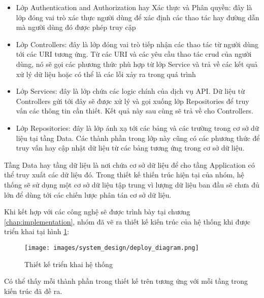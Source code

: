 \documentclass[../main.tex]{subfiles}
\begin{document}
	\begin{itemize}
		\item Lớp Authentication and Authorization hay Xác thực và Phân quyền: đây là lớp đóng vai trò xác thực người dùng
		để xác định các thao tác hay đường dẫn mà người dùng đó được phép truy cập
		\item Lớp Controllers: đây là lớp đóng vai trò tiếp nhận các thao tác từ người dùng tới các URI tương ứng. Từ các
		URI và các yêu cầu thao tác \Gls{crud} của người dùng, nó sẽ gọi các phương thức phù hợp từ lớp Service và trả về
		các kết quả xử lý dữ liệu hoặc có thể là các lỗi xảy ra trong quá trình
		\item Lớp Services: đây là lớp chứa các logic chính của dịch vụ API. Dữ liệu từ Controllers gửi tới đây sẽ được xử
		lý và gọi xuống lớp Repositories để truy vấn các thông tin cần thiết. Kết quả này sau cùng sẽ trả về cho
		Controllers.
		\item Lớp Repositories: đây là lớp ánh xạ tới các bảng và các trường trong cơ sở dữ liệu tại tầng Data. Các thành
		phần trong lớp này cũng có các phương thức để truy vấn hay cập nhật dữ liệu từ các bảng tương ứng trong cơ sở dữ
		liệu.
	\end{itemize}

	Tầng Data hay tầng dữ liệu là nơi chứa cơ sở dữ liệu để cho tầng Application có thể truy xuất các dữ liệu đó. Trong 
	thiết kế thiến trúc hiện tại của nhóm, hệ thống sẽ sử dụng một cơ sở dữ liệu tập trung vì lượng dữ liệu ban đầu sẽ 
	chưa đủ lớn để dùng tới các chiến lược phân tán cơ sở dữ liệu.

	Khi kết hợp với các công nghệ sẽ được trình bày tại chương \ref{chap:implementation}, nhóm đã vẽ ra thiết kế kiến trúc
	của hệ thống khi được triển khai tại hình \ref{fig:deploy_diagram}:

	\begin{figure}[ht]
		\centering
		\texttt{[image: images/system\_design/deploy\_diagram.png]}
		\caption{Thiết kế triển khai hệ thống}
		\label{fig:deploy_diagram}
	\end{figure}

	Có thể thấy mỗi thành phần trong thiết kế trên tương ứng với mỗi tầng trong kiến trúc đã đề ra.



\end{document}
